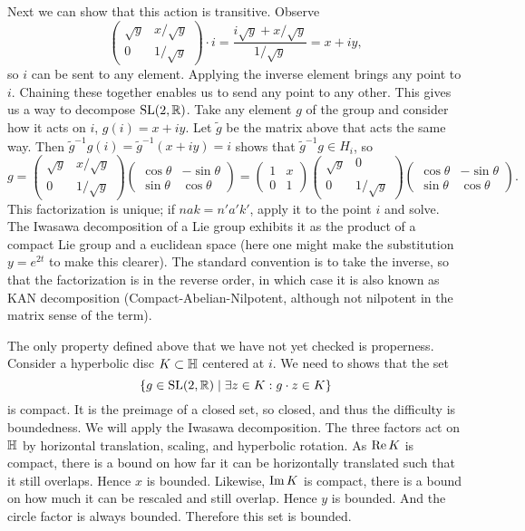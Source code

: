 \begin{example}
Next we can show that this action is transitive.
Observe
\[
\begin{pmatrix}
\sqrt{y} & x/\sqrt{y} \\ 0 & 1/\sqrt{y}
\end{pmatrix} \cdot i
= \frac{i\sqrt{y} + x/\sqrt{y}}{1/\sqrt{y}}
= x + iy,
\]
so $i$ can be sent to any element.
Applying the inverse element brings any point to $i$.
Chaining these together enables us to send any point to any other.
This gives us a way to decompose $\mathrm{SL}(2,\mathbb{R})$.
Take any element $g$ of the group and consider how it acts on $i$, $g(i) = x + iy$.
Let $\tilde{g}$ be the matrix above that acts the same way.
Then $\tilde{g}^{-1}g (i) = \tilde{g}^{-1}(x+iy) = i$ shows that $\tilde{g}^{-1}g \in H_i$, so
\[
g 
= \begin{pmatrix}
\sqrt{y} & x/\sqrt{y} \\ 0 & 1/\sqrt{y}
\end{pmatrix}\begin{pmatrix}
\cos\theta & -\sin\theta \\ \sin\theta & \cos\theta
\end{pmatrix}
= \begin{pmatrix}
1 & x \\ 0 & 1
\end{pmatrix}\begin{pmatrix}
\sqrt{y} & 0 \\ 0 & 1/\sqrt{y}
\end{pmatrix}\begin{pmatrix}
\cos\theta & -\sin\theta \\ \sin\theta & \cos\theta
\end{pmatrix}.
\]
This factorization is unique; if $nak = n'a'k'$, apply it to the point $i$ and solve.
The Iwasawa decomposition of a Lie group exhibits it as the product of a compact Lie group and a euclidean space (here one might make the substitution $y = e^{2t}$ to make this clearer).
The standard convention is to take the inverse, so that the factorization is in the reverse order, in which case it is also known as KAN decomposition (Compact-Abelian-Nilpotent, although not nilpotent in the matrix sense of the term).

The only property defined above that we have not yet checked is properness.
Consider a hyperbolic disc $K \subset \mathbb{H}$ centered at $i$. 
We need to shows that the set 
\[
\{ g \in \mathrm{SL}(2,\mathbb{R}) \mid \exists z \in K : g \cdot z \in K\}
\]
is compact.
It is the preimage of a closed set, so closed, and thus the difficulty is boundedness.
We will apply the Iwasawa decomposition.
The three factors act on $\mathbb{H}$ by horizontal translation, scaling, and hyperbolic rotation.
As $\operatorname{Re} K$ is compact, there is a bound on how far it can be horizontally translated such that it still overlaps.
Hence $x$ is bounded.
Likewise, $\operatorname{Im} K$ is compact, there is a bound on how much it can be rescaled and still overlap.
Hence $y$ is bounded.
And the circle factor is always bounded.
Therefore this set is bounded.
\end{example}

